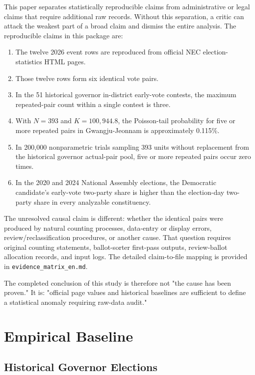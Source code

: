 \documentclass[preprint]{../ieie/IEIE}
\begin{document}
This paper separates statistically reproducible claims from administrative or legal claims that require additional raw records. Without this separation, a critic can attack the weakest part of a broad claim and dismiss the entire analysis. The reproducible claims in this package are:

\begin{enumerate}
\item The twelve 2026 event rows are reproduced from official NEC election-statistics HTML pages.
\item Those twelve rows form six identical vote pairs.
\item In the 51 historical governor in-district early-vote contests, the maximum repeated-pair count within a single contest is three.
\item With \(N=393\) and \(K=100,944.8\), the Poisson-tail probability for five or more repeated pairs in Gwangju-Jeonnam is approximately 0.115\%.
\item In 200,000 nonparametric trials sampling 393 units without replacement from the historical governor actual-pair pool, five or more repeated pairs occur zero times.
\item In the 2020 and 2024 National Assembly elections, the Democratic candidate's early-vote two-party share is higher than the election-day two-party share in every analyzable constituency.
\end{enumerate}

The unresolved causal claim is different: whether the identical pairs were produced by natural counting processes, data-entry or display errors, review/reclassification procedures, or another cause. That question requires original counting statements, ballot-sorter first-pass outputs, review-ballot allocation records, and input logs. The detailed claim-to-file mapping is provided in \texttt{evidence\_matrix\_en.md}.

The completed conclusion of this study is therefore not "the cause has been proven." It is: "official page values and historical baselines are sufficient to define a statistical anomaly requiring raw-data audit."

\section{Empirical Baseline}

\subsection{Historical Governor Elections}
\end{document}
